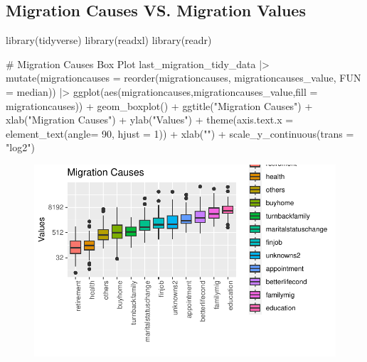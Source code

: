 \documentclass[
  11pt,
  a4paper,
  DIV=11,
  numbers=noendperiod]{scrartcl}
\newenvironment{Shaded}{\begin{snugshade}}{\end{snugshade}}
\newcommand{\AttributeTok}[1]{\textcolor[rgb]{0.40,0.45,0.13}{#1}}
\newcommand{\CommentTok}[1]{\textcolor[rgb]{0.37,0.37,0.37}{#1}}
\newcommand{\DecValTok}[1]{\textcolor[rgb]{0.68,0.00,0.00}{#1}}
\newcommand{\FunctionTok}[1]{\textcolor[rgb]{0.28,0.35,0.67}{#1}}
\newcommand{\NormalTok}[1]{\textcolor[rgb]{0.00,0.23,0.31}{#1}}
\newcommand{\SpecialCharTok}[1]{\textcolor[rgb]{0.37,0.37,0.37}{#1}}
\newcommand{\StringTok}[1]{\textcolor[rgb]{0.13,0.47,0.30}{#1}}
\begin{document}
\hypertarget{migration-causes-vs.-migration-values}{%
\subsection{Migration Causes VS. Migration
Values}\label{migration-causes-vs.-migration-values}}

\begin{Shaded}
\begin{Highlighting}[]
\FunctionTok{library}\NormalTok{(tidyverse)}
\FunctionTok{library}\NormalTok{(readxl)}
\FunctionTok{library}\NormalTok{(readr)}

\CommentTok{\# Migration Causes Box Plot}
\NormalTok{last\_migration\_tidy\_data }\SpecialCharTok{|\textgreater{}} \FunctionTok{mutate}\NormalTok{(}\AttributeTok{migrationcauses =} \FunctionTok{reorder}\NormalTok{(migrationcauses, migrationcauses\_value, }\AttributeTok{FUN =}\NormalTok{ median)) }\SpecialCharTok{|\textgreater{}}
  \FunctionTok{ggplot}\NormalTok{(}\FunctionTok{aes}\NormalTok{(migrationcauses,migrationcauses\_value,}\AttributeTok{fill =}\NormalTok{ migrationcauses)) }\SpecialCharTok{+}
  \FunctionTok{geom\_boxplot}\NormalTok{() }\SpecialCharTok{+} \FunctionTok{ggtitle}\NormalTok{(}\StringTok{"Migration Causes"}\NormalTok{) }\SpecialCharTok{+} \FunctionTok{xlab}\NormalTok{(}\StringTok{"Migration Causes"}\NormalTok{) }\SpecialCharTok{+}
  \FunctionTok{ylab}\NormalTok{(}\StringTok{"Values"}\NormalTok{) }\SpecialCharTok{+} \FunctionTok{theme}\NormalTok{(}\AttributeTok{axis.text.x =} \FunctionTok{element\_text}\NormalTok{(}\AttributeTok{angle=} \DecValTok{90}\NormalTok{, }\AttributeTok{hjust =} \DecValTok{1}\NormalTok{)) }\SpecialCharTok{+} \FunctionTok{xlab}\NormalTok{(}\StringTok{""}\NormalTok{) }\SpecialCharTok{+}
  \FunctionTok{scale\_y\_continuous}\NormalTok{(}\AttributeTok{trans =} \StringTok{"log2"}\NormalTok{) }
\end{Highlighting}
\end{Shaded}

\begin{figure}[H]

{\centering \includegraphics{analysis_files/figure-pdf/unnamed-chunk-2-1.pdf}

}

\end{figure}
\end{document}
